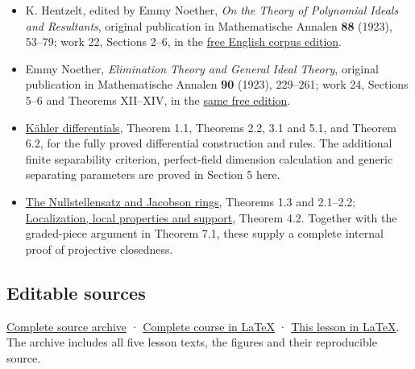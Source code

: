\documentclass[
]{article}
\providecommand{\tightlist}{%
  \setlength{\itemsep}{0pt}\setlength{\parskip}{0pt}}
\begin{document}
\begin{itemize}
\tightlist
\item
  K. Hentzelt, edited by Emmy Noether, \emph{On the Theory of Polynomial
  Ideals and Resultants}, original publication in Mathematische Annalen
  \textbf{88} (1923), 53--79; work 22, Sections 2--6, in the
  \href{https://zenodo.org/records/21923146/preview/00_EMMY_NOETHER_EN_COMPLETE_LINKED_READER.pdf?include_deleted=0}{free
  English corpus edition}.
\item
  Emmy Noether, \emph{Elimination Theory and General Ideal Theory},
  original publication in Mathematische Annalen \textbf{90} (1923),
  229--261; work 24, Sections 5--6 and Theorems XII--XIV, in the
  \href{https://zenodo.org/records/21923146/preview/00_EMMY_NOETHER_EN_COMPLETE_LINKED_READER.pdf?include_deleted=0}{same
  free edition}.
\item
  \href{../prerequisites/AG-CA/AG-CA-16.html}{Kähler differentials},
  Theorem 1.1, Theorems 2.2, 3.1 and 5.1, and Theorem 6.2, for the fully
  proved differential construction and rules. The additional finite
  separability criterion, perfect-field dimension calculation and
  generic separating parameters are proved in Section 5 here.
\item
  \href{../prerequisites/AG-CA/AG-CA-06.html}{The Nullstellensatz and
  Jacobson rings}, Theorems 1.3 and 2.1--2.2;
  \href{../prerequisites/AG-CA/AG-CA-02.html}{Localization, local
  properties and support}, Theorem 4.2. Together with the graded-piece
  argument in Theorem 7.1, these supply a complete internal proof of
  projective closedness.
\end{itemize}

\subsection{Editable sources}\label{editable-sources}

\href{ideal-theory-in-rings-source.zip}{Complete source archive} ·
\href{ideal-theory-in-rings.tex}{Complete course in LaTeX} ·
\href{NOE-IDL-05.tex}{This lesson in LaTeX}. The archive includes all
five lesson texts, the figures and their reproducible source.
\end{document}
